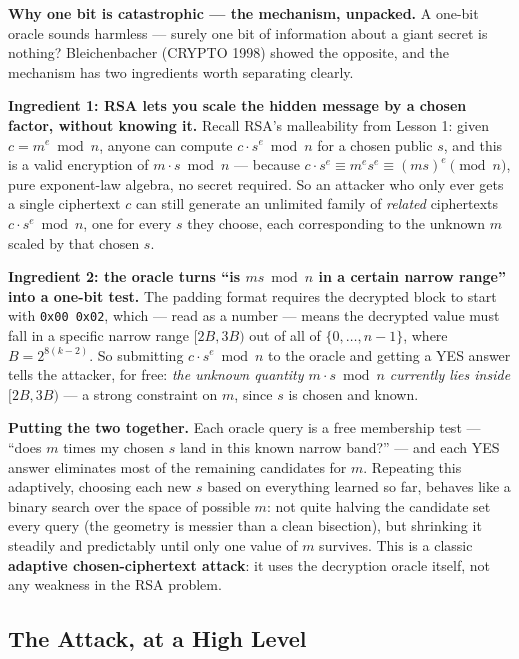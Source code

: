 \medskip\noindent\textbf{Why one bit is catastrophic — the mechanism, unpacked.} A one-bit oracle sounds harmless — surely one bit of information about a giant secret is nothing? Bleichenbacher (CRYPTO 1998) showed the opposite, and the mechanism has two ingredients worth separating clearly.

\textbf{Ingredient 1: RSA lets you scale the hidden message by a chosen factor, without knowing it.} Recall RSA's malleability from Lesson 1: given $c=m^e\bmod n$, anyone can compute $c\cdot s^e\bmod n$ for a chosen public $s$, and this is a valid encryption of $m\cdot s\bmod n$ — because $c\cdot s^e \equiv m^e s^e \equiv (ms)^e\pmod n$, pure exponent-law algebra, no secret required. So an attacker who only ever gets a single ciphertext $c$ can still generate an unlimited family of \emph{related} ciphertexts $c\cdot s^e\bmod n$, one for every $s$ they choose, each corresponding to the unknown $m$ scaled by that chosen $s$.

\textbf{Ingredient 2: the oracle turns ``is $ms\bmod n$ in a certain narrow range'' into a one-bit test.} The padding format requires the decrypted block to start with \texttt{0x00 0x02}, which — read as a number — means the decrypted value must fall in a specific narrow range $[2B,3B)$ out of all of $\{0,\dots,n-1\}$, where $B=2^{8(k-2)}$. So submitting $c\cdot s^e\bmod n$ to the oracle and getting a YES answer tells the attacker, for free: \emph{the unknown quantity $m\cdot s\bmod n$ currently lies inside $[2B,3B)$} — a strong constraint on $m$, since $s$ is chosen and known.

\textbf{Putting the two together.} Each oracle query is a free membership test — ``does $m$ times my chosen $s$ land in this known narrow band?'' — and each YES answer eliminates most of the remaining candidates for $m$. Repeating this adaptively, choosing each new $s$ based on everything learned so far, behaves like a binary search over the space of possible $m$: not quite halving the candidate set every query (the geometry is messier than a clean bisection), but shrinking it steadily and predictably until only one value of $m$ survives. This is a classic \textbf{adaptive chosen-ciphertext attack}: it uses the decryption oracle itself, not any weakness in the RSA problem.

\subsection{The Attack, at a High Level}

